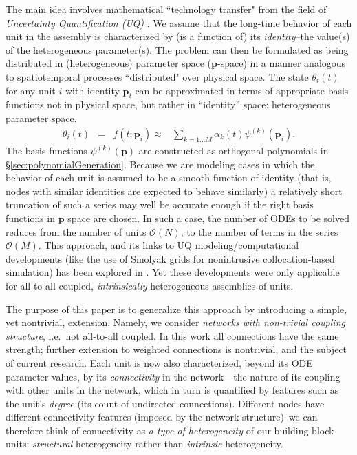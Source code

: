 \documentclass[numbers]{frontiersSCNS}
\renewcommand{\vec}[1]{\bm{#1}}
\newcommand{\numNodes}{{N}}
\newcommand{\numCofs}{{M}}
\newcommand{\basisFuncSymbol}{\psi}
\newcommand{\basisFunc}[1]{\basisFuncSymbol^{(#1)}}
\newcommand{\secRef}[1]{\S\ref{sec:#1}}
\newcommand{\scalarFuncIndex}{k}
\newcommand{\wordDefn}[1]{\emph{#1}}
\begin{document}
The main idea involves mathematical ``technology transfer" from the field of \wordDefn{Uncertainty Quantification (UQ)}
\cite{Ghanem2003,Xiu2010}.
%
We assume that the long-time behavior of each unit in the assembly
is characterized by (is a function of) its {\em identity}--the value(s) of the heterogeneous parameter(s).
%
The problem can then be formulated
as being distributed in (heterogeneous) parameter space ($\vec p$-space)
in a manner analogous to spatiotemporal processes ``distributed" over physical space.
%
The state $\theta_i(t)$ for any unit $i$ with identity $\vec p_i$ can be approximated
in terms of appropriate basis functions
not in physical space, but rather in ``identity'' space: heterogeneous parameter space.
%
\begin{equation}
\label{eqn:gPCapproximant0}
\begin{array}{rccl}
\theta_i(t) & = & f(t;\vec p_i) \approx & \sum_{\scalarFuncIndex=1\ldots\numCofs}
    \alpha_{\scalarFuncIndex}(t)
    \basisFunc{\scalarFuncIndex} (\vec p_i).
\end{array}
\end{equation}
%
The basis functions  $\basisFunc{\scalarFuncIndex} (\vec p)$
are constructed as orthogonal polynomials in \secRef{polynomialGeneration}.
%
Because we are modeling cases in which the behavior of each unit
is assumed to be a smooth function of identity
(that is, nodes with similar identities are expected to behave similarly)
a relatively short truncation of such a series may well be accurate enough if the
right basis functions in $\vec p$ space are chosen.
%
In such a case, the number of ODEs to be solved
reduces from the number of units $\mathcal O(\numNodes)$, to the number of terms in the series $\mathcal O(\numCofs)$.
%
This approach, and its links to UQ modeling/computational developments (like the use of Smolyak grids for
nonintrusive collocation-based simulation) has been explored in \cite{Laing2012b}.
%
Yet these developments were only applicable for all-to-all coupled, \emph{intrinsically} heterogeneous assemblies of units.

The purpose of this paper is to generalize this approach by introducing a simple, yet nontrivial, extension.
%
Namely, we consider \emph{networks with non-trivial coupling structure}, i.e.~not all-to-all coupled.
%
In this work all connections have the same strength; further extension
to weighted connections is nontrivial, and the subject of current research.
%
Each unit is now also characterized, beyond its ODE parameter values,
by its \emph{connectivity} in the network---the nature of its coupling with other units in the network, which
in turn is quantified by 
features such as
the unit's {\em degree} 
(its count of undirected connections).
%
Different nodes have different connectivity features (imposed by the network structure)--we
can therefore think of connectivity as {\em a type of heterogeneity} of our building block units:
\wordDefn{structural} heterogeneity rather than \wordDefn{intrinsic} heterogeneity.
\end{document}
